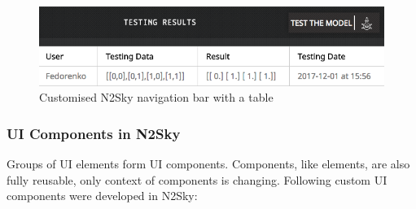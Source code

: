 \begin{figure}[htbp]
\begin{center}
  \includegraphics[scale=0.65]{components/3/components/nav_bar.png}
  \caption{Customised N2Sky navigation bar with a table}
  \label{fig:nav_bar}
\end{center}
\end{figure}

\subsubsection{UI Components in N2Sky}\label{UI Components in N2Sky}

Groups of UI elements form UI components. Components, like elements, are also fully reusable, only context of components is changing. Following custom UI components were developed in N2Sky: 

